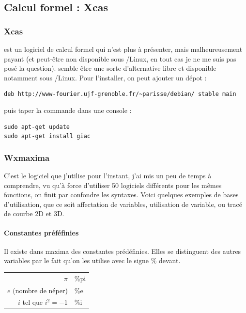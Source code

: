 \documentclass[a4paper,twoside]{article}
\begin{document}
\subsection{Calcul formel : Xcas}
\subsubsection{Xcas}
 est un logiciel de calcul formel qui n'est plus à présenter, mais malheureusement payant (et peut-être non disponible sous /Linux, en tout cas je ne me suis pas posé la question).  semble être une sorte d'alternative libre  et disponible notamment sous /Linux. Pour l'installer, on peut ajouter un dépot :

\begin{verbatim}
deb http://www-fourier.ujf-grenoble.fr/~parisse/debian/ stable main
\end{verbatim}

puis taper la commande dans une console :

\begin{verbatim}
sudo apt-get update
sudo apt-get install giac
\end{verbatim}


\subsubsection{Wxmaxima}
C'est le logiciel que j'utilise pour l'instant, j'ai mis un peu de temps à comprendre, vu qu'à force d'utiliser 50 logiciels différents pour les mêmes fonctions, on finit par confondre les syntaxes. Voici quelques exemples de bases d'utilisation, que ce soit affectation de variables, utilisation de variable, ou tracé de courbe 2D et 3D.

\paragraph{Constantes préféfinies}\label{maxima:constantes}
Il existe dans maxima des constantes prédéfinies. Elles se distinguent des autres variables par le fait qu'on les utilise avec le signe \og \% \fg devant.



\begin{tabular}{rl}
$\pi$&\%pi\\
$e$ (nombre de néper)&\%e\\
$i$ tel que $i^2=-1$&\%i
\end{tabular}
\end{document}
